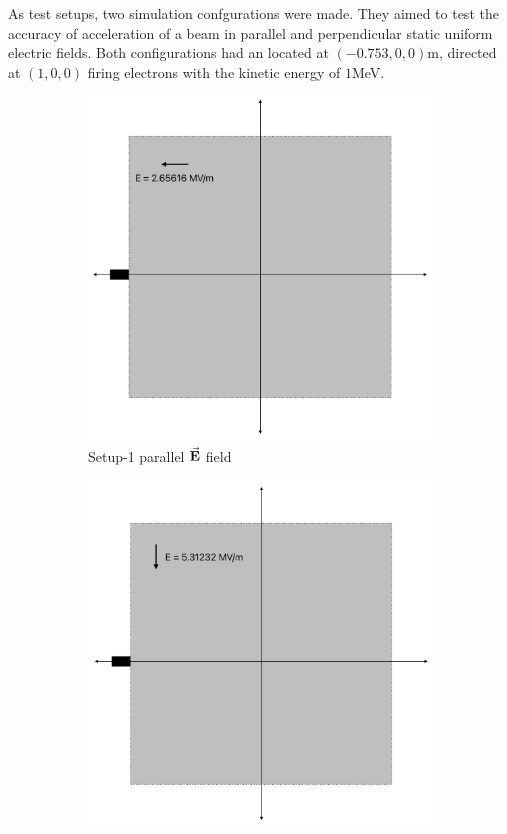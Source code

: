 \documentclass[a4paper,oneside,12pt]{report}
\numberwithin{equation}{chapter}
\begin{document}
{As test setups, two simulation confgurations were made. They aimed to test the accuracy of acceleration of a beam in parallel and perpendicular static uniform electric fields.
Both configurations had an \egun located at $(-0.753, 0, 0)$m, directed at $(1, 0, 0)$ firing electrons with the kinetic energy of $1$MeV. 
\iffalse \begin{figure}[H]
    \centering
    \begin{subfigure}{0.47\textwidth}
        \centering
        \includegraphics[width=0.9\linewidth]{./figures/illustrations/statE_1.png}
        \caption*{Setup-1 parallel $\vec{\textbf{E}}$ field}
    \end{subfigure}
    \begin{subfigure}{0.48\textwidth}
        \centering
        \includegraphics[width=0.9\linewidth]{./figures/illustrations/statE_2.png}

\end{subfigure}
\end{figure}}
\end{document}
